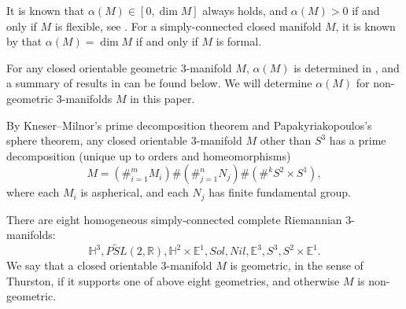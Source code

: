 \documentclass{amsart}
\newcommand{\R}{\mathbb{R}}
\begin{document}
 It is known  that  $\alpha(M)\in[0,\dim M]$ always holds, and $\alpha(M)>0$ if and only if $M$ is flexible, see \cite{DLWWW}. For a simply-connected closed manifold $M$, it is known by \cite[Theorem A, Theorem D]{BGM} that $\alpha(M)=\dim M$ if and only if $M$ is formal. 


For any closed orientable geometric 3-manifold $M$,  $\alpha(M)$ is determined  in \cite{DLWWW}, and a summary of results in \cite{DLWWW} can be found below.
 We will determine  $\alpha(M)$ for non-geometric 3-manifolds $M$ in this paper.
     

   
  
 By Kneser--Milnor's prime decomposition theorem and Papakyriakopoulos's sphere theorem, any closed orientable 3-manifold $M$ other than $S^3$ has a prime decomposition (unique up to orders and homeomorphisms)
$$M=(\#_{i=1}^mM_i)\#(\#_{j=1}^n N_j)\#(\#^kS^2\times S^1),$$ 
where each $M_i$ is aspherical, and each $N_j$ has finite fundamental group. 



There are eight homogeneous simply-connected complete Riemannian 3-manifolds:
$$\mathbb{H}^3, \widetilde{PSL}(2,\R), \mathbb{H}^2\times \mathbb{E}^1, Sol, Nil, \mathbb{E}^3, S^3, S^2\times \mathbb{E}^1.$$
We say that a closed orientable 3-manifold $M$ is geometric, in the sense of Thurston,  if it supports one of above eight geometries, and otherwise $M$ is non-geometric.
\end{document}

